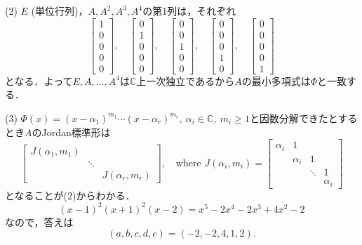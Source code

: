 \documentclass[a4j]{ltjsarticle}
\newcommand{\Cset}{\mathbb{C}}
\newcommand{\1}{\mathbbm{1}}
\numberwithin{equation}{section}
\theoremstyle{definition}
\begin{document}
(2) $E$ (単位行列)，$A,A^2,A^3,A^4$の第1列は，それぞれ
\begin{equation}
    \begin{bmatrix}
        1 \\
        0 \\
        0 \\
        0 \\
        0
    \end{bmatrix},\quad \begin{bmatrix}
        0 \\
        1 \\
        0 \\
        0 \\
        0
    \end{bmatrix},\quad \begin{bmatrix}
        0 \\
        0 \\
        1 \\
        0 \\
        0
    \end{bmatrix},\quad \begin{bmatrix}
        0 \\
        0 \\
        0 \\
        1 \\
        0
    \end{bmatrix},\quad \begin{bmatrix}
        0 \\
        0 \\
        0 \\
        0 \\
        1
    \end{bmatrix}
\end{equation}
となる．よって$E,A,\ldots,A^4$は$\Cset$上一次独立であるから$A$の最小多項式は$\Phi$と一致する．

(3) $\Phi(x)=(x-\alpha_1)^{m_1}\cdots (x-\alpha_r)^{m_r},\ \alpha_i\in\Cset,\ m_i\geq1$と因数分解できたとするとき$A$のJordan標準形は
\begin{equation}
    \begin{bmatrix}
        J(\alpha_1,m_1) \\
         & \ddots \\
         & & J(\alpha_r,m_r)
    \end{bmatrix} ,\quad \text{where }J(\alpha_i,m_i)=\begin{bmatrix}
        \alpha_i & 1 \\
        & \alpha_i & 1 \\
        & & \ddots & 1\\
        & & & \alpha_i
    \end{bmatrix}
\end{equation}
となることが(2)からわかる．
\begin{equation}
    (x-1)^2(x+1)^2(x-2)=x^5-2x^4-2x^3+4x^2-2 
\end{equation}
なので，答えは
\begin{equation}
    (a,b,c,d,e)=(-2,-2,4,1,2).
\end{equation}
\end{document}
